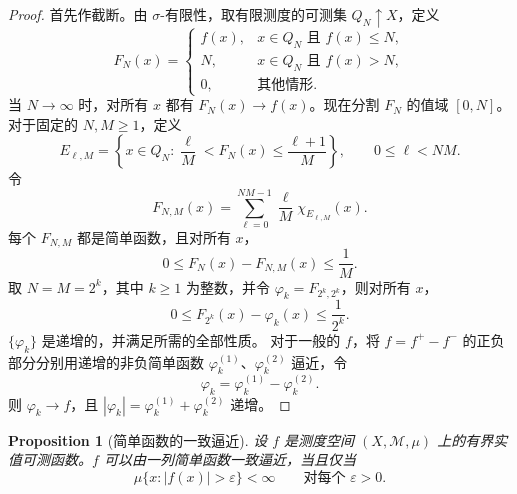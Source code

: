 \documentclass[12pt,letterpaper,twoside,openright]{ctexbook}
\theoremstyle{bluehead}
\newtheorem{proposition}[theorem]{Proposition}
\theoremstyle{olivehead}
\theoremstyle{orangehead}
\theoremstyle{redremark}
\begin{document}
\begin{proof}
首先作截断。由 $\sigma$-有限性，取有限测度的可测集 $Q_N\uparrow X$，定义
\[
  F_N(x)=
  \begin{cases}
    f(x),&x\in Q_N\text{ 且 }f(x)\leq N,\\
    N,&x\in Q_N\text{ 且 }f(x)>N,\\
    0,&\text{其他情形}.
  \end{cases}
\]
当 $N\to\infty$ 时，对所有 $x$ 都有 $F_N(x)\to f(x)$。现在分割 $F_N$ 的值域 $[0,N]$。对于固定的 $N,M\geq1$，定义
\[
  E_{\ell,M}=\left\{x\in Q_N:
    \frac{\ell}{M}<F_N(x)\leq\frac{\ell+1}{M}\right\},
  \qquad 0\leq\ell<NM.
\]
令
\[
  F_{N,M}(x)=\sum_{\ell=0}^{NM-1}\frac{\ell}{M}\chi_{E_{\ell,M}}(x).
\]
每个 $F_{N,M}$ 都是简单函数，且对所有 $x$，
\[
  0\leq F_N(x)-F_{N,M}(x)\leq\frac1M.
\]
取 $N=M=2^k$，其中 $k\geq1$ 为整数，并令 $\varphi_k=F_{2^k,2^k}$，则对所有 $x$，
\[
  0\leq F_{2^k}(x)-\varphi_k(x)\leq\frac1{2^k}.
\]
$\{\varphi_k\}$ 是递增的，并满足所需的全部性质。
对于一般的 $f$，将 $f=f^+-f^-$ 的正负部分分别用递增的非负简单函数 $\varphi_k^{(1)}$、$\varphi_k^{(2)}$ 逼近，令
\[
  \varphi_k=\varphi_k^{(1)}-\varphi_k^{(2)}.
\]
则 $\varphi_k\to f$，且 $|\varphi_k|=\varphi_k^{(1)}+\varphi_k^{(2)}$ 递增。\end{proof}
\begin{proposition}[简单函数的一致逼近]\label{prop:uniform-simple-approx}
设 $f$ 是测度空间 $(X,\mathcal M,\mu)$ 上的有界实值可测函数。$f$ 可以由一列简单函数一致逼近，当且仅当
\[
\mu\{x:|f(x)|>\varepsilon\}<\infty\qquad\text{对每个 }\varepsilon>0.
\]
\end{proposition}
\end{document}
